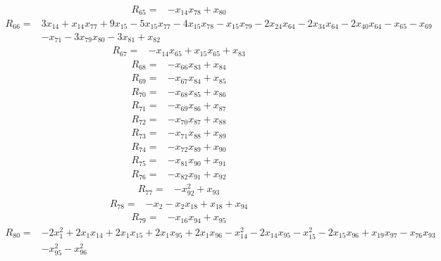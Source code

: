 \begin{align*}
 R_{65}={}&-x_{14}x_{78} +x_{80}
\end{align*}
\begin{align*}
 R_{66}={}&3x_{14} +x_{14}x_{77} +9x_{15} -5x_{15}x_{77} -4x_{15}x_{78} -x_{15}x_{79} -2x_{24}x_{64} -2x_{34}x_{64} -2x_{40}x_{64} -x_{65} -x_{69}\\
 &-x_{71} -3x_{79}x_{80} -3x_{81} +x_{82}
\end{align*}
\begin{align*}
 R_{67}={}&-x_{14}x_{65} +x_{15}x_{65} +x_{83}
\end{align*}
\begin{align*}
 R_{68}={}&-x_{66}x_{83} +x_{84}
\end{align*}
\begin{align*}
 R_{69}={}&-x_{67}x_{84} +x_{85}
\end{align*}
\begin{align*}
 R_{70}={}&-x_{68}x_{85} +x_{86}
\end{align*}
\begin{align*}
 R_{71}={}&-x_{69}x_{86} +x_{87}
\end{align*}
\begin{align*}
 R_{72}={}&-x_{70}x_{87} +x_{88}
\end{align*}
\begin{align*}
 R_{73}={}&-x_{71}x_{88} +x_{89}
\end{align*}
\begin{align*}
 R_{74}={}&-x_{72}x_{89} +x_{90}
\end{align*}
\begin{align*}
 R_{75}={}&-x_{81}x_{90} +x_{91}
\end{align*}
\begin{align*}
 R_{76}={}&-x_{82}x_{91} +x_{92}
\end{align*}
\begin{align*}
 R_{77}={}&-x_{92}^{2} +x_{93}
\end{align*}
\begin{align*}
 R_{78}={}&-x_{2} -x_{2}x_{18} +x_{18} +x_{94}
\end{align*}
\begin{align*}
 R_{79}={}&-x_{16}x_{94} +x_{95}
\end{align*}
\begin{align*}
 R_{80}={}&-2x_{1}^{2} +2x_{1}x_{14} +2x_{1}x_{15} +2x_{1}x_{95} +2x_{1}x_{96} -x_{14}^{2} -2x_{14}x_{95} -x_{15}^{2} -2x_{15}x_{96} +x_{19}x_{97} -x_{76}x_{93}\\
 &-x_{95}^{2} -x_{96}^{2}
\end{align*}
